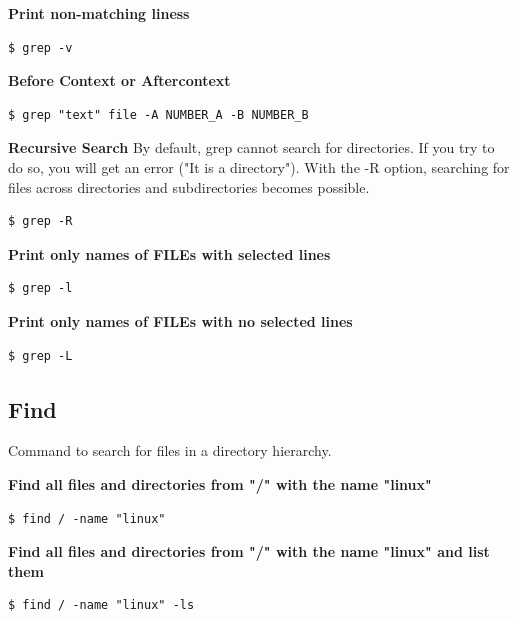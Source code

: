 \documentclass{article}
\newenvironment{codetemplate}[1][]{%
  \mybasecolorbox[#1]
  \itshape
}{%
  \endmybasecolorbox
}
\begin{document}
\textbf{Print non-matching liness}
\begin{codetemplate}{}
\begin{verbatim}
$ grep -v
\end{verbatim}
\end{codetemplate}

\textbf{Before Context or Aftercontext}
\begin{codetemplate}{}
\begin{verbatim}
$ grep "text" file -A NUMBER_A -B NUMBER_B
\end{verbatim}
\end{codetemplate}


\textbf{Recursive Search}
By default, grep cannot search for directories. If you try to do so, you will get an error ("It is a directory"). With the -R option, searching for files across directories and subdirectories becomes possible.
\begin{codetemplate}{}
\begin{verbatim}
$ grep -R
\end{verbatim}
\end{codetemplate}

\textbf{Print only names of FILEs with selected lines}
\begin{codetemplate}{}
\begin{verbatim}
$ grep -l
\end{verbatim}
\end{codetemplate}

\textbf{Print only names of FILEs with no selected lines}
\begin{codetemplate}{}
\begin{verbatim}
$ grep -L
\end{verbatim}
\end{codetemplate}


\subsection{Find}

Command to search for files in a directory hierarchy.


\textbf{Find all files and directories from "/" with the name "linux"}
\begin{codetemplate}{}
\begin{verbatim}
$ find / -name "linux"
\end{verbatim}
\end{codetemplate}

\textbf{Find all files and directories from "/" with the name "linux" and list them}
\begin{codetemplate}{}
\begin{verbatim}
$ find / -name "linux" -ls
\end{verbatim}
\end{codetemplate}
\end{document}
